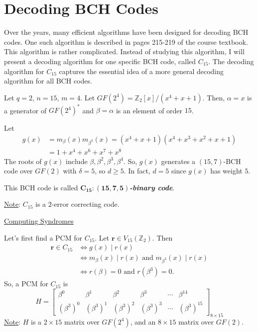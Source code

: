 \section{Decoding BCH Codes}
Over the years, many efficient algorithms have been designed for decoding
BCH codes. One such algorithm is described in pages 215-219 of the
course textbook. This algorithm is rather complicated. Instead of studying
this algorithm, I will present a decoding algorithm for one specific
BCH code, called $ C_{15} $. The decoding algorithm for $ C_{15} $
captures the essential idea of a more general decoding algorithm for all
BCH codes.

\begin{defbox}
    \begin{definition}
        Let $ q=2 $, $ n=15 $, $ m=4 $. Let $ GF(2^4)=\mathbb{Z}_2[x]/(x^4+x+1) $.
        Then, $ \alpha=x $ is a generator of $ GF(2^4)^* $ and $ \beta=\alpha $
        is an element of order $ 15 $.

        Let
        \begin{align*}
            g(x)
             & =m_{\beta}(x)m_{\beta^3}(x)=(x^4+x+1)(x^4+x^3+x^2+x+1) \\
             & =1+x^4+x^6+x^7+x^8
        \end{align*}
        The roots of $ g(x) $ include $ \beta,\beta^2,\beta^3,\beta^4 $. So,
        $ g(x) $ generates a $ (15,7) $-BCH code over $ GF(2) $
        with $ \delta=5 $, so $ d\geqslant 5 $. In fact, $ d=5 $
        since $ g(x) $ has weight $ 5 $.

        This BCH code is called \textbf{\emph{$ \bm{C_{15}:(15,7,5)} $-binary code}}.

        \underline{Note}: $ C_{15} $ is a $ 2 $-error correcting code.
    \end{definition}
\end{defbox}

\underline{Computing Syndromes}

Let's first find a PCM for $ C_{15} $. Let $ \bm{r}\in V_{15}(\mathbb{Z}_2) $.
Then
\begin{align*}
    \bm{r}\in C_{15}
     & \iff g(x)\mid r(x)                                            \\
     & \iff m_{\beta}(x)\mid r(x)\text{ and }m_{\beta^3}(x)\mid r(x) \\
     & \iff r(\beta)=0\text{ and } r(\beta^3)=0.
\end{align*}
So, a PCM for $ C_{15} $ is
\[ H=
    \begin{bmatrix}
        \beta^0     & \beta^1     & \beta^2     & \beta^3     & \cdots & \beta^{14}     \\
        (\beta^3)^0 & (\beta^3)^1 & (\beta^3)^2 & (\beta^3)^3 & \cdots & (\beta^3)^{15}
    \end{bmatrix}_{8\times 15} \]
\underline{Note}: $ H $ is a $ 2\times 15 $ matrix over $ GF(2^4) $,
and an $ 8\times 15 $ matrix over $ GF(2) $.

